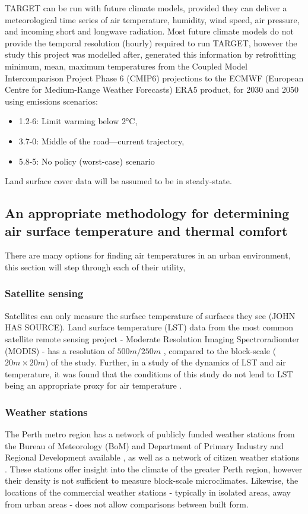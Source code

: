 \documentclass[a4paper, 12pt]{report}
\begin{document}
TARGET can be run with future climate models, provided they can deliver a meteorological time series of air temperature, humidity, wind speed, air pressure, and incoming short and longwave radiation. Most future climate models do not provide the temporal resolution (hourly) required to run TARGET, however the study this project was modelled after, \cite{TARGET-ERA5} generated this information by retrofitting minimum, mean, maximum temperatures from the Coupled Model Intercomparison Project Phase 6 (CMIP6) projections \parencite{CMIP6} to the ECMWF (European Centre for Medium-Range Weather Forecasts) ERA5 product, for 2030 and 2050 using emissions scenarios:  \begin{itemize}
    \item 1.2-6: Limit warming below 2°C,
    \item 3.7-0: Middle of the road—current trajectory,
    \item 5.8-5: No policy (worst-case) scenario
\end{itemize}
Land surface cover data will be assumed to be in steady-state.
\subsection{An appropriate methodology for determining air surface temperature and thermal comfort}
There are many options for finding air temperatures in an urban environment, this section will step through each of their utility,
\subsubsection{Satellite sensing} Satellites can only measure the surface temperature of surfaces they see (JOHN HAS SOURCE). Land surface temperature (LST) data from the most common satellite remote sensing project - Moderate Resolution Imaging Spectroradiomter (MODIS) - has a resolution of $500m/250m$ \parencite{LST_res}, compared to the block-scale ($20m\times 20m$) of the study. Further, in a study of the dynamics of LST and air temperature, it was found that the conditions of this study do not lend to LST being an appropriate proxy for air temperature \parencite{LST-TA}.
\subsubsection{Weather stations}
The Perth metro region has a network of publicly funded weather stations from the Bureau of Meteorology (BoM) and Department of Primary Industry and Regional Development available \parencite{agricDPIRDWeather}, as well as a network of citizen weather stations \parencite{netatmoWeathermap}. These stations offer insight into the climate of the greater Perth region, however their density is not sufficient to measure block-scale microclimates. Likewise, the locations of the commercial weather stations - typically in isolated areas, away from urban areas \parencite{BoM-guidelines} - does not allow comparisons between built form. 
\end{document}
